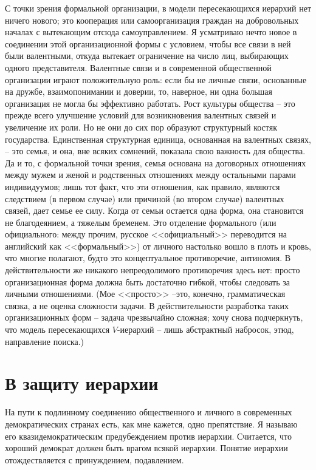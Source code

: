 \documentclass{book}
\begin{document}
С точки зрения формальной организации, в модели пересека­ющихся иерархий нет ничего нового; это кооперация или самоор­ганизация граждан на добровольных началах с вытекающим от­сюда самоуправлением. Я усматриваю нечто новое в соединении этой организационной формы с условием, чтобы все связи в ней были валентными, откуда вытекает ограничение на число лиц, выбирающих одного представителя. Валентные связи и в совре­менной общественной организации играют положительную роль:
если бы не личные связи, основанные на дружбе, взаимопонима­нии и доверии, то, наверное, ни одна большая организация не мог­ла бы эффективно работать. Рост культуры общества -- это преж­де всего улучшение условий для возникновения валентных свя­зей и увеличение их роли. Но не они до сих пор образуют струк­турный костяк государства. Единственная структурная единица, основанная на валентных связях, -- это семья, и она, вне всяких сомнений, показала свою важность для общества. Да и то, с фор­мальной точки зрения, семья основана на договорных отношениях между мужем и женой и родственных отношениях между осталь­ными парами индивидуумов; лишь тот факт, что эти отношения, как правило, являются следствием (в первом случае) или причи­ной (во втором случае) валентных связей, дает семье ее силу. Когда от семьи остается одна форма, она становится не благодея­нием, а тяжелым бременем. Это отделение формального  (или официального:  между прочим, русское <<официальный>> перево­дится на английский как <<формальный>>) от 
личного 
 настолько вошло в плоть и кровь, что многие полагают, будто это концеп­туальное противоречие, антиномия. В действительности же ника­кого непреодолимого противоречия здесь нет: просто организа­ционная форма должна быть достаточно гибкой, чтобы следо­вать за личными отношениями. (Мое <<просто>> --это, конечно, грамматическая связка, а не оценка сложности задачи. В дейст­вительности разработка таких организационных форм -- задача чрезвычайно сложная; хочу снова подчеркнуть, что модель пересекающихся $V$-иерархий -- лишь абстрактный набросок, этюд, направление поиска.)



\section{В защиту иерархии}

На пути к подлинному соединению общественного и личного в современных демократических странах есть, как мне кажется, одно препятствие. Я называю его квазидемократическим преду­беждением против иерархии. Считается, что хороший демократ должен быть врагом всякой иерархии. Понятие иерархии отож­дествляется с принуждением, подавлением.
\end{document}
